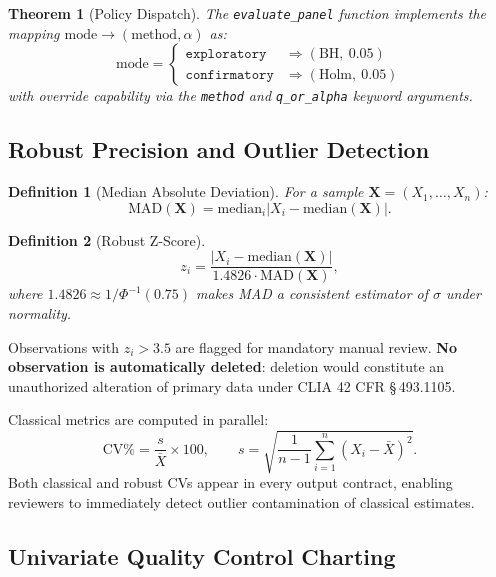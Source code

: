 \documentclass[11pt,a4paper]{article}
\newtheorem{definition}{Definition}[section]
\newtheorem{theorem}{Theorem}[section]
\begin{document}
\begin{theorem}[Policy Dispatch]
The \texttt{evaluate\_panel} function implements the mapping
$\mathrm{mode} \to (\mathrm{method}, \alpha)$ as:
\[
  \mathrm{mode} = \begin{cases}
    \texttt{exploratory}   & \Rightarrow (\mathrm{BH},\ 0.05) \\
    \texttt{confirmatory}  & \Rightarrow (\mathrm{Holm},\ 0.05)
  \end{cases}
\]
with override capability via the \texttt{method} and \texttt{q\_or\_alpha}
keyword arguments.
\end{theorem}

\subsection{Robust Precision and Outlier Detection}
\label{sec:precision}

\begin{definition}[Median Absolute Deviation]
For a sample $\mathbf{X} = (X_1,\ldots,X_n)$:
\[
  \mathrm{MAD}(\mathbf{X}) = \mathrm{median}_i\bigl|X_i - \mathrm{median}(\mathbf{X})\bigr|.
\]
\end{definition}

\begin{definition}[Robust Z-Score]
\[
  z_i = \frac{|X_i - \mathrm{median}(\mathbf{X})|}{1.4826 \cdot \mathrm{MAD}(\mathbf{X})},
\]
where $1.4826 \approx 1/\Phi^{-1}(0.75)$ makes MAD a consistent estimator
of $\sigma$ under normality.
\end{definition}

Observations with $z_i > 3.5$ are flagged for mandatory manual review.
\textbf{No observation is automatically deleted}: deletion would constitute an
unauthorized alteration of primary data under CLIA 42 CFR \S\,493.1105.

Classical metrics are computed in parallel:
\[
  \mathrm{CV\%} = \frac{s}{\bar{X}} \times 100,
  \qquad
  s = \sqrt{\frac{1}{n-1}\sum_{i=1}^n (X_i - \bar{X})^2}.
\]
Both classical and robust CVs appear in every output contract, enabling
reviewers to immediately detect outlier contamination of classical estimates.

\subsection{Univariate Quality Control Charting}
\label{sec:univariate}
\end{document}
